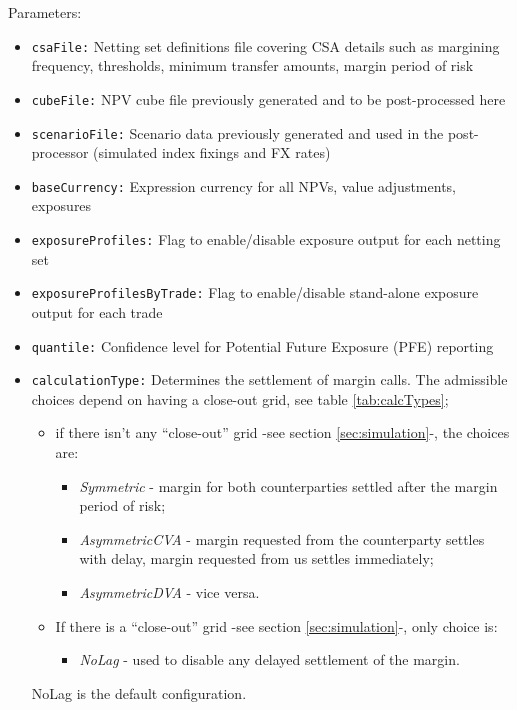 \documentclass[12pt, a4paper]{article}
\begin{document}
Parameters:
\begin{itemize}
\item {\tt csaFile:} Netting set definitions file covering CSA details such as margining frequency, thresholds, minimum
transfer amounts, margin period of risk
\item {\tt cubeFile:} NPV cube file previously generated and to be post-processed here
\item {\tt scenarioFile:} Scenario data previously generated and used in the post-processor (simulated index fixings and
FX rates)
\item {\tt baseCurrency:} Expression currency for all NPVs, value adjustments, exposures
\item {\tt exposureProfiles:} Flag to enable/disable exposure output for each netting set
\item {\tt exposureProfilesByTrade:} Flag to enable/disable stand-alone exposure output for each trade
\item {\tt quantile:} Confidence level for Potential Future Exposure (PFE) reporting
\item {\tt calculationType:} Determines the settlement of margin calls. The admissible choices depend on having a close-out grid, see table \ref{tab:calcTypes}; \\
	\begin{itemize}
		\item if there isn't any ``close-out'' grid -see section \ref{sec:simulation}-, the choices are:
		\begin{itemize}
			\item {\em Symmetric} - margin for both counterparties settled after the margin period of risk;
			\item {\em AsymmetricCVA} - margin requested from the counterparty settles with delay,
			margin requested from us settles immediately;
			\item {\em AsymmetricDVA} - vice versa.
		\end{itemize}
		\item If there is a ``close-out'' grid -see section \ref{sec:simulation}-, only choice is:
		\begin{itemize}
			\item {\em NoLag} - used to disable any delayed settlement of the margin. 
		\end{itemize}
	\end{itemize}
%
NoLag is the default configuration.
%
\begin{table}[!h]

\end{table}
\end{itemize}
\end{document}

